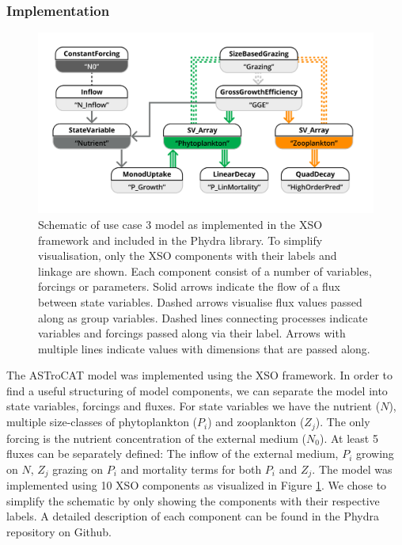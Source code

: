 \documentclass[journal abbreviation, manuscript]{copernicus}
\begin{document}
\subsubsection{Implementation}
\begin{figure}[t]
\includegraphics[width=15cm]{Figures/firstdraft_schematics/code_schematics/ASTroCAT.pdf}
\caption{Schematic of use case 3 model as implemented in the XSO framework and included in the Phydra library. To simplify visualisation, only the XSO components with their labels and linkage are shown. Each component consist of a number of variables, forcings or parameters. Solid arrows indicate the flow of a flux between state variables. Dashed arrows visualise flux values passed along as group variables. Dashed lines connecting processes indicate variables and forcings passed along via their label. Arrows with multiple lines indicate values with dimensions that are passed along.}
\label{Figure:CodeSchematics_3}
\end{figure}

The ASTroCAT model was implemented using the XSO framework. In order to find a useful structuring of model components, we can separate the model into state variables, forcings and fluxes. For state variables we have the nutrient ($N$), multiple size-classes of phytoplankton ($P_i$) and zooplankton ($Z_j$). The only forcing is the nutrient concentration of the external medium ($N_0$). At least 5 fluxes can be separately defined: The inflow of the external medium, $P_i$ growing on $N$, $Z_j$ grazing on $P_i$ and mortality terms for both $P_i$ and $Z_j$.
The model was implemented using 10 XSO components as visualized in Figure \ref{Figure:CodeSchematics_3}. We chose to simplify the schematic by only showing the components with their respective labels. A detailed description of each component can be found in the Phydra repository on Github.
\end{document}
